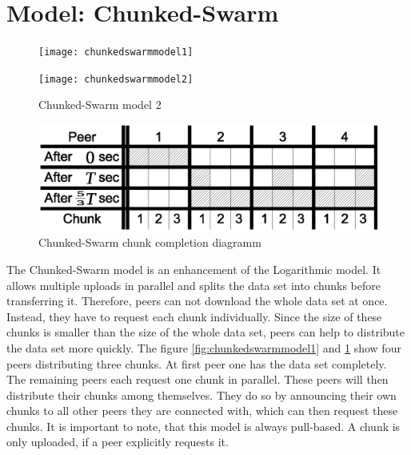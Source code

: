 \section{Model: Chunked-Swarm}
\label{sec:chunkedswarmmodel}

\begin{figure} [ht]
	\centering
	\begin{minipage}[b]{0.4\linewidth}
		\centering
		\texttt{[image: chunkedswarmmodel1]}
		\caption{Chunked-Swarm model 1}
		\label{fig:chunkedswarmmodel1}
	\end{minipage}
	\hspace{0.1\linewidth}
	\begin{minipage}[b]{0.4\linewidth}
		\centering
		\texttt{[image: chunkedswarmmodel2]}
		\caption{Chunked-Swarm model 2}
		\label{fig:chunkedswarmmodel2}
	\end{minipage}
\end{figure}

\begin{figure}[ht]
	\centering
	\includegraphics[width=0.8\linewidth]{chunkedswarmformula1}
	\caption{Chunked-Swarm chunk completion diagramm}
	\label{fig:chunkedswarmformula1}
\end{figure}

The Chunked-Swarm model is an enhancement of the Logarithmic model. It allows multiple uploads in parallel and splits the data set into chunks before transferring it. Therefore, peers can not download the whole data set at once. Instead, they have to request each chunk individually. Since the size of these chunks is smaller than the size of the whole data set, peers can help to distribute the data set more quickly. The figure \ref{fig:chunkedswarmmodel1} and \ref{fig:chunkedswarmmodel2} show four peers distributing three chunks. At first peer one has the data set completely. The remaining peers each request one chunk in parallel. These peers will then distribute their chunks among themselves. They do so by announcing their own chunks to all other peers they are connected with, which can then request these chunks. It is important to note, that this model is always pull-based. A chunk is only uploaded, if a peer explicitly requests it.

